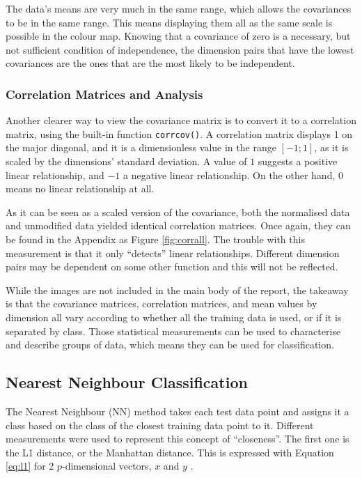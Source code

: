 \documentclass[a4paper, 10pt, conference]{ieeeconf}
\begin{document}
The data's means are very much in the same range, which allows the covariances to be in the same range. This means displaying them all as the same scale is possible in the colour map. Knowing that a covariance of zero is a necessary, but not sufficient condition of independence, the dimension pairs that have the lowest covariances are the ones that are the most likely to be independent.

\subsubsection{Correlation Matrices and Analysis}
Another clearer way to view the covariance matrix is to convert it to a correlation matrix, using the built-in function \texttt{corrcov()}. A correlation matrix displays 1 on the major diagonal, and it is a dimensionless value in the range $[-1; 1]$, as it is scaled by the dimensions' standard deviation. A value of $1$ suggests a positive linear relationship, and $-1$ a negative linear relationship. On the other hand, $0$ means no linear relationship at all.

As it can be seen as a scaled version of the covariance, both the normalised data and unmodified data yielded identical correlation matrices. Once again, they can be found in the Appendix as Figure \ref{fig:corrall}. The trouble with this measurement is that it only ``detects'' linear relationships. Different dimension pairs may be dependent on some other function and this will not be reflected.

While the images are not included in the main body of the report, the takeaway is that the covariance matrices, correlation matrices, and mean values by dimension all vary according to whether all the training data is used, or if it is separated by class. Those statistical measurements can be used to characterise and describe groups of data, which means they can be used for classification.

\subsection{Nearest Neighbour Classification}
The Nearest Neighbour (NN) method takes each test data point and assigns it a class based on the class of the closest training data point to it. Different measurements were used to represent this concept of ``closeness''. The first one is the L1 distance, or the Manhattan distance. This is expressed with Equation \ref{eq:l1} for 2 $p$-dimensional vectors, $x$ and $y$ \cite{metrics}.
\end{document}

